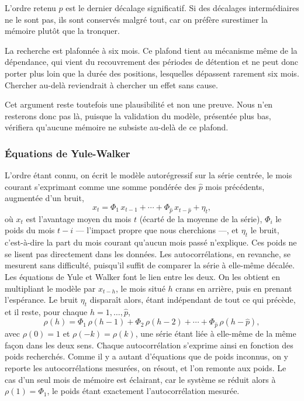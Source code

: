 L'ordre retenu \(\hat p\) est le dernier décalage significatif. Si des
décalages intermédiaires ne le sont pas, ils sont conservés malgré tout, car
on préfère surestimer la mémoire plutôt que la tronquer.

La recherche est plafonnée à six mois. Ce plafond tient au mécanisme même de
la dépendance, qui vient du recouvrement des périodes de détention et ne peut
donc porter plus loin que la durée des positions, lesquelles dépassent
rarement six mois. Chercher au-delà reviendrait à chercher un effet sans
cause.

Cet argument reste toutefois une plausibilité et non une preuve. Nous n'en
resterons donc pas là, puisque la validation du modèle, présentée plus bas,
vérifiera qu'aucune mémoire ne subsiste au-delà de ce plafond.

\subsubsection*{Équations de Yule-Walker}

L'ordre étant connu, on écrit le modèle autorégressif sur la série centrée, le
mois courant s'exprimant comme une somme pondérée des \(\hat p\) mois
précédents, augmentée d'un bruit,
\[
  x_t = \Phi_1\, x_{t-1} + \cdots + \Phi_{\hat p}\, x_{t-\hat p} + \eta_t ,
\]
où \(x_t\) est l'avantage moyen du mois \(t\) (écarté de la moyenne de la
série), \(\Phi_i\) le poids du mois \(t-i\) — l'impact propre que nous
cherchions —, et \(\eta_t\) le bruit, c'est-à-dire la part du mois courant
qu'aucun mois passé n'explique.
Ces poids ne se lisent pas directement dans les données. Les autocorrélations,
en revanche, se mesurent sans difficulté, puisqu'il suffit de comparer la série
à elle-même décalée. Les équations de Yule et Walker font le lien entre les
deux. On les obtient en multipliant le modèle par \(x_{t-h}\), le mois situé
\(h\) crans en arrière, puis en prenant l'espérance. Le bruit \(\eta_t\)
disparaît alors, étant indépendant de tout ce qui précède, et il reste, pour
chaque \(h = 1, \ldots, \hat p\),
\[
  \rho(h) = \Phi_1\,\rho(h-1) + \Phi_2\,\rho(h-2) + \cdots + \Phi_{\hat p}\,\rho(h-\hat p),
\]
avec \(\rho(0) = 1\) et \(\rho(-k) = \rho(k)\), une série étant liée à
elle-même de la même façon dans les deux sens. Chaque autocorrélation
s'exprime ainsi en fonction des poids recherchés. Comme il y a autant
d'équations que de poids inconnus, on y reporte les autocorrélations mesurées,
on résout, et l'on remonte aux poids. Le cas d'un seul mois de mémoire est
éclairant, car le système se réduit alors à \(\rho(1) = \Phi_1\), le poids
étant exactement l'autocorrélation mesurée.

